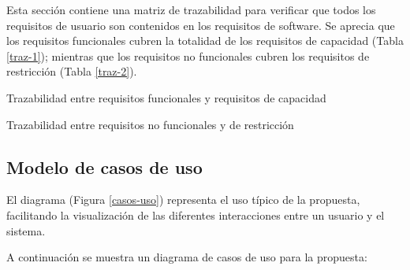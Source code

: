 Esta sección contiene una matriz de trazabilidad para verificar que todos los requisitos de usuario son contenidos en los requisitos de software. Se aprecia que los requisitos funcionales cubren la totalidad de los requisitos de capacidad (Tabla \ref{traz-1}); mientras que los requisitos no funcionales cubren los requisitos de restricción (Tabla \ref{traz-2}).

\begin{table}[H]
    \traceabilityFNCA
    \caption{Trazabilidad entre requisitos funcionales y requisitos de capacidad}
    \label{traz-1}
\end{table}

\begin{table}[H]
    \traceabilityNFRE
    \caption{Trazabilidad entre requisitos no funcionales y de restricción}
    \label{traz-2}
\end{table}

\subsection{Modelo de casos de uso}

El diagrama (Figura \ref{casos-uso}) representa el uso típico de la propuesta, facilitando la visualización de las diferentes interacciones entre un usuario y el sistema. 

\printuctemplate{}

A continuación se muestra un diagrama de casos de uso para la propuesta:

